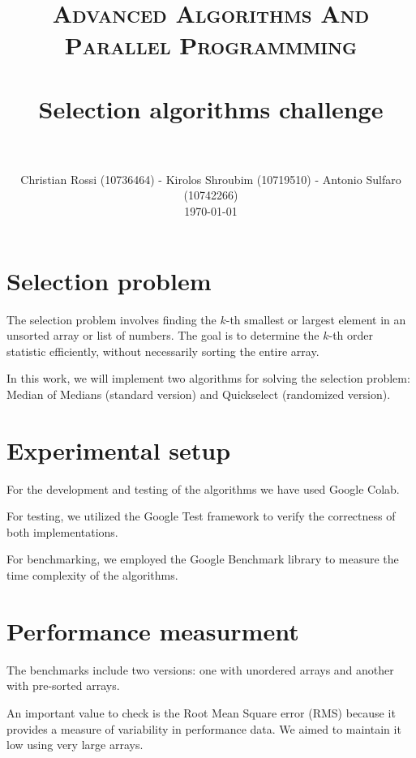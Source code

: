 \documentclass[paper=a4, fontsize=12pt]{scrartcl}
\title{
		\vspace{-1in} 	
		\usefont{OT1}{bch}{b}{n}
		\normalfont \normalsize \textsc{Advanced Algorithms And Parallel Programmming} \\ [25pt]
		\horrule{0.5pt} \\[0.4cm]
		\huge Selection algorithms challenge \\
		\horrule{2pt} \\[0.5cm]
}
\author{
		\normalfont 								\normalsize
        Christian Rossi (10736464) - Kirolos Shroubim (10719510) - Antonio Sulfaro (10742266)\\[-3pt]		\normalsize
        \today
}
\date{}
\numberwithin{equation}{section}
\numberwithin{figure}{section}
\numberwithin{table}{section}
\begin{document}
    \maketitle

    \section{Selection problem}
    The selection problem involves finding the $k$-th smallest or largest element in an unsorted array or list of numbers.
    The goal is to determine the $k$-th order statistic efficiently, without necessarily sorting the entire array.
    
    In this work, we will implement two algorithms for solving the selection problem: Median of Medians (standard version) and Quickselect (randomized version).

    \section{Experimental setup}
    For the development and testing of the algorithms we have used Google Colab.
    
    For testing, we utilized the Google Test framework to verify the correctness of both implementations.
    
    For benchmarking, we employed the Google Benchmark library to measure the time complexity of the algorithms.
    
    \section{Performance measurment}
    The benchmarks include two versions: one with unordered arrays and another with pre-sorted arrays.
    
    An important value to check is the Root Mean Square error (RMS) because it provides a measure of variability in performance data.
    We aimed to maintain it low using very large arrays. 
\end{document}
